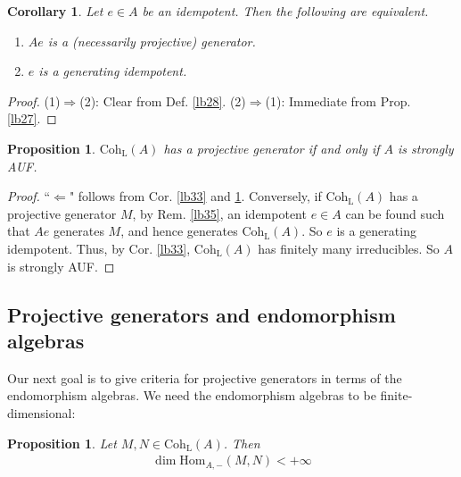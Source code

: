 \documentclass[11pt,b5paper,notitlepage]{article}
\theoremstyle{definition}
\theoremstyle{plain}
\newtheorem{pp}[df]{Proposition}
\newtheorem{co}[df]{Corollary}
\newcommand{\Hom}{\mathrm{Hom}}
\newcommand{\Coh}{\mathrm{Coh}_{\mathrm L}}
\numberwithin{equation}{section}
\begin{document}
\begin{co}\label{lb32}
Let $e\in A$ be an idempotent. Then the following are equivalent.
\begin{enumerate}[label=(\arabic*)]
\item $Ae$ is a (necessarily projective) generator.
\item $e$ is a generating idempotent.
\end{enumerate}
\end{co}

\begin{proof}
(1)$\Rightarrow$(2): Clear from Def. \ref{lb28}. (2)$\Rightarrow$(1): Immediate from Prop. \ref{lb27}.
\end{proof}







\begin{pp}\label{lb50}
$\Coh(A)$ has a projective generator if and only if $A$ is strongly AUF.
\end{pp}

\begin{proof}
``$\Leftarrow$" follows from Cor. \ref{lb33} and \ref{lb32}. Conversely, if $\Coh(A)$ has a projective generator $M$, by Rem. \ref{lb35}, an idempotent $e\in A$ can be found such that $Ae$ generates $M$, and hence generates $\Coh(A)$. So $e$ is a generating idempotent. Thus, by Cor. \ref{lb33}, $\Coh(A)$ has finitely many irreducibles. So $A$ is strongly AUF.
\end{proof}



\subsection{Projective generators and endomorphism algebras}

Our next goal is to give criteria for projective generators in terms of the endomorphism algebras. We need the endomorphism algebras to be finite-dimensional:

\begin{pp}\label{lb29}
Let $M,N\in\Coh(A)$. Then
\begin{align*}
\dim \Hom_{A,-}(M,N)<+\infty
\end{align*}
\end{pp}
\end{document}
